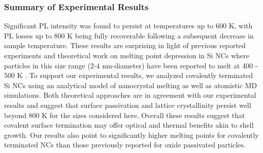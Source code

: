\subsubsection{Summary of Experimental Results}
Significant PL intensity was found to persist at temperatures up to 600 K, with PL losses up to 800 K being fully recoverable following a subsequent decrease in sample temperature. These results are surprising in light of previous reported experiments and theoretical work on melting point depression in Si NCs where particles in this size range (2-4 nm-diameter) have been reported to melt at 400 - 500 K \cite{goldstein1996melting, hirasawa2006size, lu2009size, wautelet1991estimation}. To support our experimental results, we analyzed covalently terminated Si NCs using an analytical model of nanocrystal melting as well as atomistic MD simulations. Both theoretical approaches are in agreement with our experimental results and suggest that surface passivation and lattice crystallinity persist well beyond 800 K for the sizes considered here. Overall these results suggest that covalent surface termination may offer optical and thermal benefits akin to shell growth. Our results also point to significantly higher melting points for covalently terminated NCs than those previously reported for oxide passivated particles.

